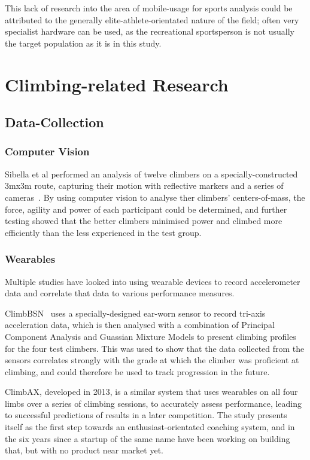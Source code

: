 This lack of research into the area of mobile-usage for sports analysis could be attributed to the generally elite-athlete-orientated nature of the field;
often very specialist hardware can be used, as the recreational sportsperson is not usually the target population as it is in this study.


\section{Climbing-related Research}
\subsection{Data-Collection}

\subsubsection{Computer Vision}
Sibella et al performed an analysis of twelve climbers on a specially-constructed 3mx3m route, capturing their motion with reflective markers and a series of cameras~\cite{centreofmass}.
By using computer vision to analyse ther climbers' centers-of-mass, the force, agility and power of each participant could be determined, and further testing showed that the better climbers minimised power and climbed more efficiently than the less experienced in the test group.



\subsubsection{Wearables}
Multiple studies have looked into using wearable devices to record accelerometer data and correlate that data to various performance measures.

ClimbBSN~\cite{climbbsn} uses a specially-designed ear-worn  sensor to record tri-axis acceleration data, which is then analysed with a combination of Principal Component Analysis and Guassian Mixture Models to present climbing profiles for the four test climbers.
This was used to show that the data collected from the sensors correlates strongly with the grade at which the climber was proficient at climbing, and could therefore be used to track progression in the future.


ClimbAX, developed in 2013, \cite{climbaxstudy} is a similar system that uses wearables on all four limbs over a series of climbing sessions, to accurately assess performance, leading to successful predictions of results in a later competition.
The study presents itself as the first step towards an enthusiast-orientated coaching system, and in the six years since a startup of the same name have been working on building that, but with no product near market yet.


